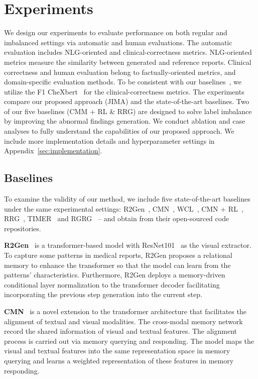 \documentclass[sn-mathphys-num]{sn-jnl}%
\theoremstyle{thmstyleone}%
\theoremstyle{thmstyletwo}%
\theoremstyle{thmstylethree}%
\begin{document}
\section{Experiments}

We design our experiments to evaluate performance on both regular and imbalanced settings via automatic and human evaluations. 
The automatic evaluation includes NLG-oriented and clinical-correctness metrics.
NLG-oriented metrics measure the similarity between generated and reference reports. 
Clinical correctness and human evaluation belong to factually-oriented metrics, and domain-specific evaluation methods. 
To be consistent with our baselines~\cite{chen2020generating, delbrouck2022improving, wu2023token}, we utilize the F1 CheXbert~\cite{smit2020combining} for the clinical-correctness metrics. 
The experiments compare our proposed approach (JIMA) and the state-of-the-art baselines. 
Two of our five baselines (CMM + RL \& RRG) are designed to solve label imbalance by improving the abnormal findings generation. 
We conduct ablation and case analyses to fully understand the capabilities of our proposed approach.
We include more implementation details and hyperparameter settings in Appendix~\ref{sec:implementation}.


\subsection{Baselines}
\label{subsec:baselines}
To examine the validity of our method, we include five state-of-the-art baselines under the same experimental settings:
R2Gen~\cite{chen2020generating}, CMN~\cite{chen2021cross}, WCL~\cite{yan2021weakly}, CMN + RL~\cite{qin2022reinforced}, RRG~\cite{delbrouck2023overview}, TIMER~\cite{wu2023token} and RGRG~\cite{tanida2023interactive} -- and obtain from their open-sourced code repositories.

\textbf{R2Gen}~\cite{chen2020generating} is a transformer-based model with ResNet101~\cite{he2016deep} as the visual extractor. To capture some patterns in medical reports, R2Gen proposes a relational memory to enhance the transformer so that the model can learn from the patterns' characteristics.  Furthermore, R2Gen deploys a memory-driven conditional layer normalization to the transformer decoder facilitating incorporating the previous step generation into the current step.
    
\textbf{CMN}~\cite{chen2021cross} is a novel extension to the transformer architecture that facilitates the alignment of textual and visual modalities. The cross-modal memory network record the shared information of visual and textual features. The alignment process is carried out via memory querying and responding. The model maps the visual and textual features into the same representation space in memory querying and learns a weighted representation of these features in memory responding.
\end{document}
